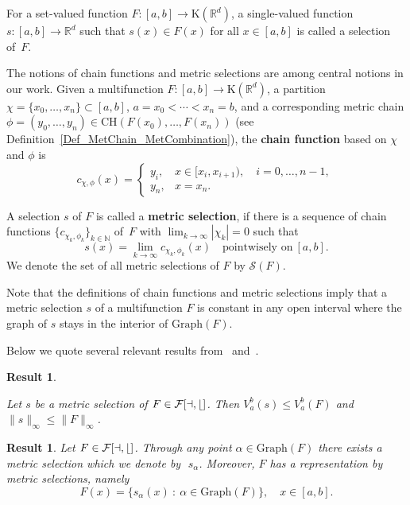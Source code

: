 \documentclass[final,3p,mathptmx]{article}%
\newcommand{\R}{{\mathbb R}}
\newcommand{\N}{{\mathbb N}}
\newcommand{\Rd}{{\R}^d}
\newcommand{\Comp}{\mathrm{K}(\Rd)}
\newcommand{\CH}{{\mathrm{CH}}}
\newcommand{\Graph}{{\mathrm{Graph}}}
\newcommand{\calF}{\cal{F}[a,b]}
\newcommand{\setMS}{\mathcal{S}(F)}
\newtheorem{result}[remark]{Result}
\begin{document}
{{{{For a set-valued function $F : [a,b] \to \Comp$, a single-valued function ${s:[a,b] \to \Rd}$ such that $s(x) \in F(x)$ for all $x \in [a,b]$ is called a selection of~$F$.

The notions of chain functions and metric selections are among central notions in our work.
Given a multifunction $F: [a,b] \to \Comp$, a partition $\chi=\{x_0,\ldots,x_n\} \subset [a,b]$, $a=x_0 < \cdots < x_n=b$, and a corresponding metric chain $\phi=(y_0,\ldots,y_n) \in \CH \left ( F(x_0),\ldots,F(x_n) \right )$ (see Definition~\ref{Def_MetChain_MetCombination}), the \textbf{chain function} based on $\chi$ and $\phi$ is
\begin{equation}\label{def_ChainFunc}
	c_{\chi, \phi}(x)= \left \{ \begin{array}{ll}
		y_i, & x \in [x_i,x_{i+1}), \quad i=0,\ldots,n-1,\, \\
		y_n, & x=x_n.
	\end{array}
	\right.
\end{equation}

A selection $s$ of $F$ is called a \textbf{metric selection}, if there is a sequence of chain functions $\{ c_{\chi_k, \phi_k} \}_{k \in \N}$ of~$F$ with ${\lim_{k \to \infty} |\chi_k| =0}$ such that
$$
s(x)=\lim_{k\to \infty} c_{\chi_k, \phi_k}(x) \quad \mbox{pointwisely on} \ [a,b].
$$
We denote the set of all metric selections of $F$ by $\setMS$.

Note that the definitions of chain functions and metric selections imply that a metric selection $s$ of a multifunction $F$ is constant in any open interval where the graph of $s$ stays in the interior of  $\Graph(F)$.

Below we quote several relevant results from~\cite{DFM:MetricIntegral} and~\cite{BDFM:2021}.

\begin{result}\label{Result_MetrSel_InheritVariation}\cite[Theorem~3.6]{DFM:MetricIntegral}
	
	Let $s$ be a metric selection of $F \in \calF$. Then $V_a^b(s) \le V_a^b(F)$ and $\|s\|_\infty\le \|F\|_\infty$.
\end{result}
\begin{result}\label{Result_MetSel_ThroughAnyPoint_Repres}\cite[Corollary~3.7]{DFM:MetricIntegral}
	Let $F \in \calF$. Through any point $\alpha \in \Graph(F)$ there exists a metric selection which we denote by~${\,s_\alpha}$.
	Moreover,  $F$ has a representation by metric selections, namely
	$$
	F(x) = \{ s_\alpha(x) \ :\ \alpha \in \Graph(F)\}, \quad x\in [a,b].
	$$
\end{result}

}}}}
\end{document}

